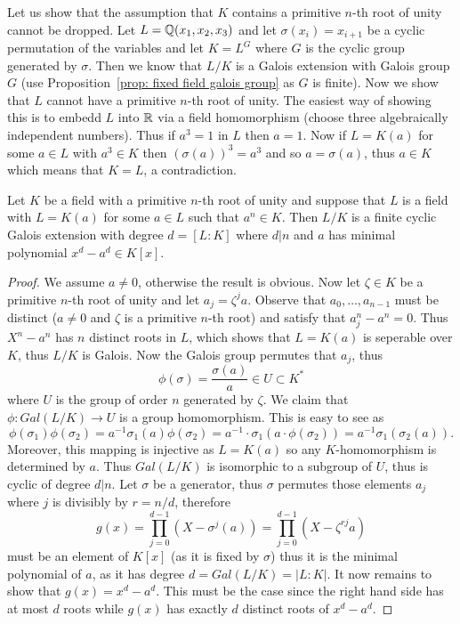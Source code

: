 \documentclass[twoside, a4paper, 10pt]{amsart}
\begin{document}
\begin{eg} Let us show that the assumption that $K$ contains a primitive $n$-th root of unity cannot be dropped. Let $L = \mathbb{Q}(x_1,x_2,x_3)$ and let $\sigma(x_i) = x_{i+1}$ be a cyclic permutation of the variables and let $K = L^{G}$ where $G$ is the cyclic group generated by $\sigma$. Then we know that $L/K$ is a Galois extension with Galois group $G$ (use Proposition~\ref{prop: fixed field galois group} as $G$ is finite). Now we show that $L$ cannot have a primitive $n$-th root of unity. The easiest way of showing this is to embedd $L$ into $\mathbb{R}$ via a field homomorphism (choose three algebraically independent numbers). Thus if $a^3 = 1$ in $L$ then $a=1$. Now if $L=K(a)$ for some $a \in L$ with $a^3 \in K$ then $(\sigma(a))^3 = a^3$ and so $a = \sigma(a)$, thus $a \in K$ which means that $K = L$, a contradiction. \end{eg}

\begin{prop} Let $K$ be a field with a primitive $n$-th root of unity and suppose that $L$ is a field with $L=K(a)$ for some $a \in L$ such that $a^n \in K$. Then $L/K$ is a finite cyclic Galois extension with degree $d = [L:K]$ where $d | n$ and $a$ has minimal polynomial $x^d - a^d \in K[x]$.

\end{prop}

\begin{proof} We assume $a \neq 0$, otherwise the result is obvious. Now let $\zeta \in K$ be a primitive $n$-th root of unity and let $a_j = \zeta^j a$. Observe that $a_0, \ldots, a_{n-1}$ must be distinct ($a \neq 0$ and $\zeta$ is a primitive $n$-th root) and satisfy that $a_j^n - a^n =0$. Thus $X^n - a^n$ has $n$ distinct roots in $L$, which shows that $L=K(a)$ is seperable over $K$, thus $L/K$ is Galois. Now the Galois group permutes that $a_j$, thus $$\phi(\sigma) = \frac{\sigma(a)}{a} \in U \subset K^{*}$$ where $U$ is the group of order $n$ generated by $\zeta$. We claim that $\phi:Gal(L/K) \to U$ is a group homomorphism. This is easy to see as $$\phi(\sigma_1) \phi(\sigma_2) = a^{-1} \sigma_1(a) \phi(\sigma_2) = a^{-1}\cdot \sigma_1(a \cdot \phi(\sigma_2)) = a^{-1}\sigma_1(\sigma_2(a)).$$ Moreover, this mapping is injective as $L=K(a)$ so any $K$-homomorphism is determined by $a$. Thus $Gal(L/K)$ is isomorphic to a subgroup of $U$, thus is cyclic of degree $d | n$. Let $\sigma$ be a generator, thus $\sigma$ permutes those elements $a_j$ where $j$ is divisibly by $r = n/d$, therefore $$g(x) = \prod_{j=0}^{d-1}(X - \sigma^j(a)) = \prod_{j=0}^{d-1}(X - \zeta^{rj} a)$$ must be an element of $K[x]$ (as it is fixed by $\sigma$) thus it is the minimal polynomial of $a$, as it has degree $d = Gal(L/K) = |L:K|$. It now remains to show that $g(x) = x^d - a^d$. This must be the case since the right hand side has at most $d$ roots while $g(x)$ has exactly $d$ distinct roots of $x^d - a^d$. \end{proof}
\end{document}
